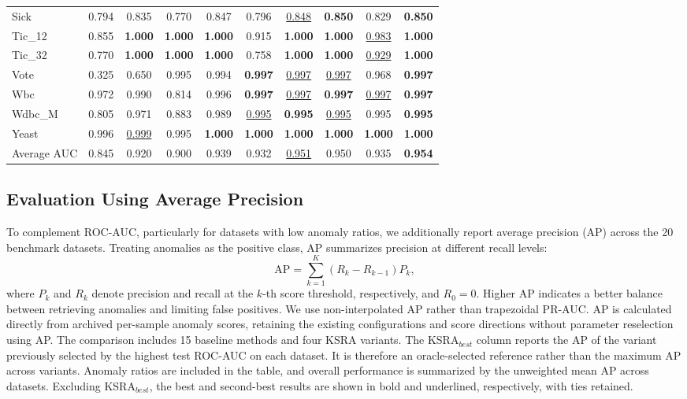 \documentclass[ASNA,twocolumn]{USG} %
\begin{document}
\begin{table}[!ht]
{\begin{tabular}{lcccc|cccc|c}
            Sick & 0.794 & 0.835 & 0.770 & 0.847 & 0.796 & \underline{0.848} & \textbf{0.850} & 0.829 & \textbf{0.850} \\
            Tic\_12 & 0.855 & \textbf{1.000} & \textbf{1.000} & \textbf{1.000} & 0.915 & \textbf{1.000} & \textbf{1.000} & \underline{0.983} & \textbf{1.000} \\
            Tic\_32 & 0.770 & \textbf{1.000} & \textbf{1.000} & \textbf{1.000} & 0.758 & \textbf{1.000} & \textbf{1.000} & \underline{0.929} & \textbf{1.000} \\
            Vote & 0.325 & 0.650 & 0.995 & 0.994 & \textbf{0.997} & \underline{0.997} & \underline{0.997} & 0.968 & \textbf{0.997} \\
            Wbc & 0.972 & 0.990 & 0.814 & 0.996 & \textbf{0.997} & \underline{0.997} & \textbf{0.997} & \underline{0.997} & \textbf{0.997} \\
            Wdbc\_M & 0.805 & 0.971 & 0.883 & 0.989 & \underline{0.995} & \textbf{0.995} & \underline{0.995} & 0.995 & \textbf{0.995} \\
            Yeast & 0.996 & \underline{0.999} & 0.995 & \textbf{1.000} & \textbf{1.000} & \textbf{1.000} & \textbf{1.000} & \textbf{1.000} & \textbf{1.000} \\
            \midrule
            Average AUC & 0.845 & 0.920 & 0.900 & 0.939 & 0.932 & \underline{0.951} & 0.950 & 0.935 & \textbf{0.954} \\
            \bottomrule
        \end{tabular}}
\end{table}

\subsection{Evaluation Using Average Precision}

To complement ROC-AUC, particularly for datasets with low anomaly ratios, we additionally report average precision (AP) across the 20 benchmark datasets. Treating anomalies as the positive class, AP summarizes precision at different recall levels:
\begin{equation*}\label{AP_equ}
    \mathrm{AP}=\sum_{k=1}^{K}(R_k-R_{k-1})P_k,
\end{equation*}
where $P_k$ and $R_k$ denote precision and recall at the $k$-th score threshold, respectively, and $R_0=0$. Higher AP indicates a better balance between retrieving anomalies and limiting false positives. We use non-interpolated AP rather than trapezoidal PR-AUC.
AP is calculated directly from archived per-sample anomaly scores, retaining the existing configurations and score directions without parameter reselection using AP. The comparison includes 15 baseline methods and four KSRA variants. The KSRA$_{best}$ column reports the AP of the variant previously selected by the highest test ROC-AUC on each dataset. It is therefore an oracle-selected reference rather than the maximum AP across variants. Anomaly ratios are included in the table, and overall performance is summarized by the unweighted mean AP across datasets. Excluding KSRA$_{best}$, the best and second-best results are shown in bold and underlined, respectively, with ties retained.
\end{document}
